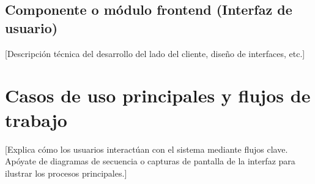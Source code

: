 \subsection{Componente o módulo frontend (Interfaz de usuario)}
[Descripción técnica del desarrollo del lado del cliente, diseño de interfaces, etc.]

\section{Casos de uso principales y flujos de trabajo}

[Explica cómo los usuarios interactúan con el sistema mediante flujos clave. Apóyate de diagramas de secuencia o capturas de pantalla de la interfaz para ilustrar los procesos principales.]
